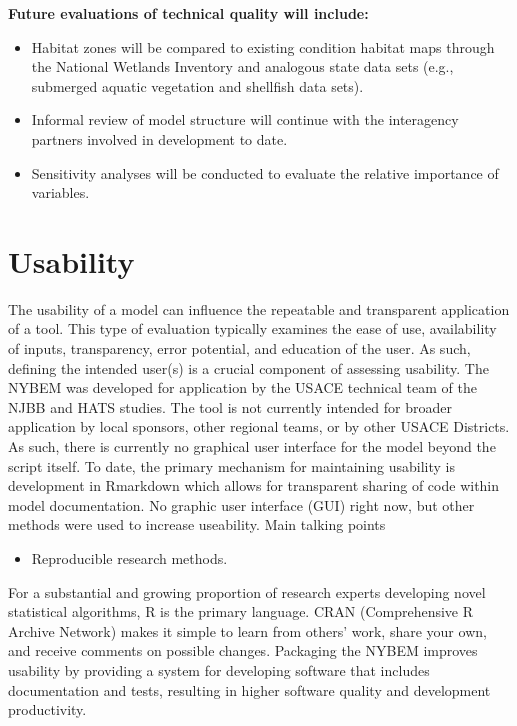 \documentclass[
]{book}
\providecommand{\tightlist}{%
  \setlength{\itemsep}{0pt}\setlength{\parskip}{0pt}}
\begin{document}
\textbf{Future evaluations of technical quality will include:}

\begin{itemize}
\item
  Habitat zones will be compared to existing condition habitat maps through the National Wetlands Inventory and analogous state data sets (e.g., submerged aquatic vegetation and shellfish data sets).
\item
  Informal review of model structure will continue with the interagency partners involved in development to date.
\item
  Sensitivity analyses will be conducted to evaluate the relative importance of variables.
\end{itemize}

\hypertarget{usability}{%
\section{Usability}\label{usability}}

The usability of a model can influence the repeatable and transparent application of a tool. This type of evaluation typically examines the ease of use, availability of inputs, transparency, error potential, and education of the user. As such, defining the intended user(s) is a crucial component of assessing usability. The NYBEM was developed for application by the USACE technical team of the NJBB and HATS studies. The tool is not currently intended for broader application by local sponsors, other regional teams, or by other USACE Districts. As such, there is currently no graphical user interface for the model beyond the script itself. To date, the primary mechanism for maintaining usability is development in Rmarkdown which allows for transparent sharing of code within model documentation.
No graphic user interface (GUI) right now, but other methods were used to increase useability. Main talking points

\begin{itemize}
\tightlist
\item
  Reproducible research methods.
\end{itemize}

For a substantial and growing proportion of research experts developing novel statistical algorithms, R is the primary language. CRAN (Comprehensive R Archive Network) makes it simple to learn from others' work, share your own, and receive comments on possible changes. Packaging the NYBEM improves usability by providing a system for developing software that includes documentation and tests, resulting in higher software quality and development productivity.
\end{document}
